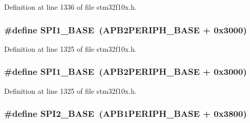 Definition at line 1336 of file stm32f10x.\+h.

\subsubsection[{\texorpdfstring{S\+P\+I1\+\_\+\+B\+A\+SE}{SPI1_BASE}}]{\setlength{\rightskip}{0pt plus 5cm}\#define S\+P\+I1\+\_\+\+B\+A\+SE~({\bf A\+P\+B2\+P\+E\+R\+I\+P\+H\+\_\+\+B\+A\+SE} + 0x3000)}\hypertarget{group___peripheral__memory__map_ga50cd8b47929f18b05efbd0f41253bf8d}{}\label{group___peripheral__memory__map_ga50cd8b47929f18b05efbd0f41253bf8d}


Definition at line 1325 of file stm32f10x.\+h.

\subsubsection[{\texorpdfstring{S\+P\+I1\+\_\+\+B\+A\+SE}{SPI1_BASE}}]{\setlength{\rightskip}{0pt plus 5cm}\#define S\+P\+I1\+\_\+\+B\+A\+SE~({\bf A\+P\+B2\+P\+E\+R\+I\+P\+H\+\_\+\+B\+A\+SE} + 0x3000)}\hypertarget{group___peripheral__memory__map_ga50cd8b47929f18b05efbd0f41253bf8d}{}\label{group___peripheral__memory__map_ga50cd8b47929f18b05efbd0f41253bf8d}


Definition at line 1325 of file stm32f10x.\+h.

\subsubsection[{\texorpdfstring{S\+P\+I2\+\_\+\+B\+A\+SE}{SPI2_BASE}}]{\setlength{\rightskip}{0pt plus 5cm}\#define S\+P\+I2\+\_\+\+B\+A\+SE~({\bf A\+P\+B1\+P\+E\+R\+I\+P\+H\+\_\+\+B\+A\+SE} + 0x3800)}\hypertarget{group___peripheral__memory__map_gac3e357b4c25106ed375fb1affab6bb86}{}\label{group___peripheral__memory__map_gac3e357b4c25106ed375fb1affab6bb86}


